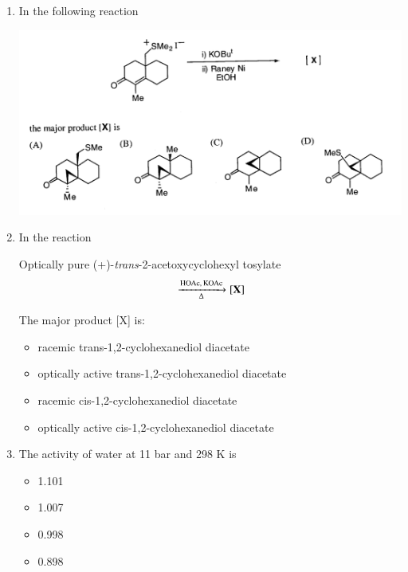 \documentclass[journal,12pt,onecolumn]{IEEEtran}
\theoremstyle{remark}
\begin{document}
\begin{enumerate}
\item    \hspace{0.5cm} In the following reaction  \hfill{}

\begin{center}
\includegraphics[width=\textwidth]{figs/image18.png}
\end{center}


 

\item    \hspace{0.5cm} In the reaction  \hfill{}

\begin{center}
\noindent Optically pure (+)-\textit{trans}-2-acetoxycyclohexyl tosylate
\[
\ce{->[\ce{HOAc}, \ce{KOAc}][\Delta]}[\textbf{X}]
\]
\end{center}

The major product [X] is:

\begin{multicols}{2}
\begin{itemize}[label=(A)]
    \item racemic trans-1,2-cyclohexanediol diacetate
    \item optically active trans-1,2-cyclohexanediol diacetate
    \item racemic cis-1,2-cyclohexanediol diacetate
    \item optically active cis-1,2-cyclohexanediol diacetate
\end{itemize}
\end{multicols}

 

\item    \hspace{0.5 cm} The activity of water at 11 bar and 298 K is  \hfill{}

\begin{multicols}{2}
\begin{itemize}[label=(A)]
    \item 1.101
    \item 1.007
    \item 0.998
    \item 0.898
\end{itemize}
\end{multicols}


\end{enumerate}
\end{document}
